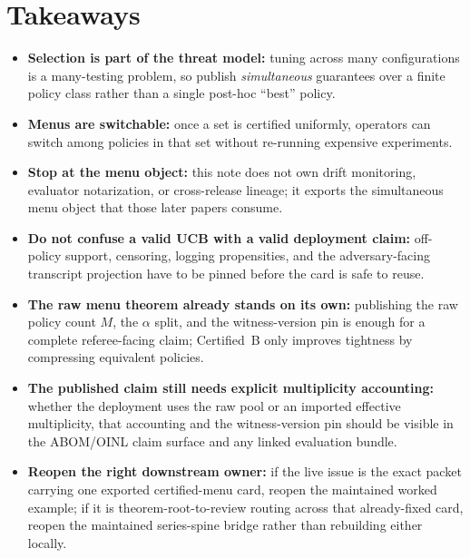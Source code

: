 \documentclass[11pt]{article}
\begin{document}
\section{Takeaways}
\begin{itemize}[leftmargin=*]
\item \textbf{Selection is part of the threat model:} tuning across many configurations is a many-testing problem, so publish \emph{simultaneous} guarantees over a finite policy class rather than a single post-hoc ``best'' policy.
\item \textbf{Menus are switchable:} once a set is certified uniformly, operators can switch among policies in that set without re-running expensive experiments.
\item \textbf{Stop at the menu object:} this note does not own drift monitoring, evaluator notarization, or cross-release lineage; it exports the simultaneous menu object that those later papers consume.
\item \textbf{Do not confuse a valid UCB with a valid deployment claim:} off-policy support, censoring, logging propensities, and the adversary-facing transcript projection have to be pinned before the card is safe to reuse.
\item \textbf{The raw menu theorem already stands on its own:} publishing the raw policy count $M$, the $\alpha$ split, and the witness-version pin is enough for a complete referee-facing claim; Certified~B only improves tightness by compressing equivalent policies.
\item \textbf{The published claim still needs explicit multiplicity accounting:} whether the deployment uses the raw pool or an imported effective multiplicity, that accounting and the witness-version pin should be visible in the ABOM/OINL claim surface and any linked evaluation bundle.
\item \textbf{Reopen the right downstream owner:} if the live issue is the exact packet carrying one exported certified-menu card, reopen the maintained worked example; if it is theorem-root-to-review routing across that already-fixed card, reopen the maintained series-spine bridge rather than rebuilding either locally.
\end{itemize}
\end{document}
